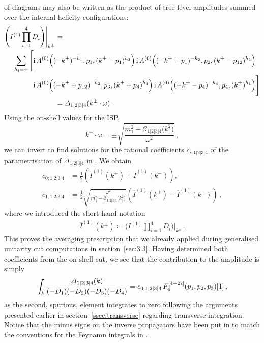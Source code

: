 of diagrams may also be written as the product of tree-level amplitudes summed
over the internal helicity configurations:
\begin{align}
  \Biggr( I^{(1)} \prod_{i=1}^4 D_i \Biggl) \Biggl|_{k^\pm} & = \nonumber\\
  & \hspace{-2.15cm}  \sum_{h_i=\pm} \Bigg[ \i \, A^{(0)}\Bigl((-k^\pm)^{-h_1},p_1,(k^\pm-p_1)^{h_2} \Bigr) \,
  \i \, A^{(0)}\Bigl((-k^\pm+p_1)^{-h_2},p_2,(k^\pm-p_{12})^{h_3}\Bigr) \, \nonumber\\
  & \hspace{-2.15cm} \phantom{ \sum_{h_i=\pm} \Bigg[} \, \i \, A^{(0)}\Bigl((-k^\pm+p_{12})^{-h_3},p_3,(k^\pm+p_4)^{h_4}\Bigr) \,
  \i \, A^{(0)}\Bigl((-k^\pm-p_4)^{-h_4},p_4,(k^\pm)^{h_1}\Bigr) \Bigg] \nonumber\\
  & = \Delta_{1|2|3|4}(k^\pm\cdot\omega) \,.
  \label{eq:quadcuteq}
\end{align}
%
Using the on-shell values for the ISP,
\begin{equation}
  k^\pm\cdot \omega = \pm \sqrt{\frac{m_1^2-\mathcal{C}_{1|2|3|4}\bigl(k_{\parallel}^2\bigr)}{\omega^2}} \,,
  \label{eq:onshellISPsol}
\end{equation}
we can invert  to find solutions for the rational coefficients $c_{i;1|2|3|4}$ of the
parametrisation of $\Delta_{1|2|3|4}$ in . We obtain
\begin{align}
  c_{0;1|2|3|4} &= \frac{1}{2}\left( \overline{I}^{(1)}(k^+) +  \overline{I}^{(1)}(k^-) \right), \\
  c_{1;1|2|3|4} &= \frac{1}{2}\sqrt{\frac{\omega^2}{m_1^2-\mathcal{C}_{1|2|3|4}\bigl( k_{\parallel}^2 \bigr)}} \left( \overline{I}^{(1)}(k^+) -  \overline{I}^{(1)}(k^-) \right) \,,
\end{align}
where we introduced the short-hand notation
\begin{align}
\overline{I}^{(1)}(k^\pm) \coloneqq \Biggr( I^{(1)} \prod_{i=1}^4 D_i \Biggl) \Biggl|_{k^\pm} \,.
\end{align}
This proves the averaging prescription that we already applied during generalised unitarity cut computations in section~\ref{sec:3.3}. 
Having determined both coefficients from the on-shell cut, we see that the contribution to the amplitude is simply
\begin{equation}
  \int_k \frac{\Delta_{1|2|3|4}(k)}{(-D_1) (-D_2) (-D_3) (-D_4)}  = c_{0;1|2|3|4} \, F^{[4-2\eps]}_4(p_1,p_2,p_3)[1] \,,
  \label{eq:Delta4integrated}
\end{equation}
as the second, spurious, element integrates to zero following the arguments
presented earlier in section~\ref{ssec:transverse} regarding transverse integration. Notice that the minus signs on the inverse propagators have been put in to match the conventions for the Feynamn integrals in .

